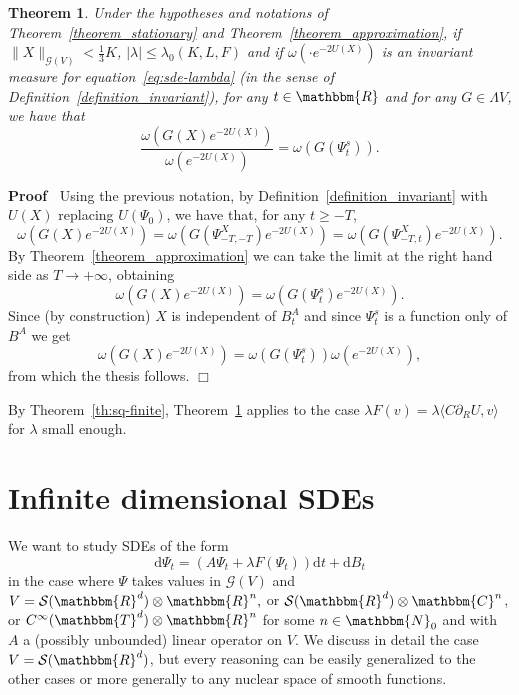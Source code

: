 \documentclass[11pt]{article}
\newcommand{\mathd}{\mathrm{d}}
\newenvironment{proof}{\noindent\textbf{Proof\ }}{\hspace*{\fill}$\Box$\medskip}
\newtheorem{theorem}{Theorem}
\begin{document}
\begin{theorem}
  \label{theorem_invariant2}Under the hypotheses and notations of
  Theorem~\ref{theorem_stationary} and Theorem~\ref{theorem_approximation}, if
  $\| X \|_{\mathcal{G} (V)} < \frac{1}{3} K$, $| \lambda | \leqslant
  \lambda_0 (K, L, F)$ and if $\omega (\cdot e^{- 2 U (X)})$ is an invariant
  measure for equation~{\eqref{eq:sde-lambda}} (in the sense of
  Definition~\ref{definition_invariant}), for any $t \in \mathbbm{R}$ and for
  any $G \in \Lambda V$, we have that
  \[ \frac{\omega (G (X) e^{- 2 U (X)})}{\omega (e^{- 2 U (X)})} = \omega (G
     (\Psi^s_t)) . \]
\end{theorem}

\begin{proof}
  Using the previous notation, by Definition~\ref{definition_invariant} with
  $U (X)$ replacing $U (\Psi_0)$, we have that, for any $t \geqslant - T$,
  \[ \omega (G (X) e^{- 2 U (X)}) = \omega (G (\Psi_{- T, - T}^X) e^{- 2 U
     (X)}) = \omega (G (\Psi_{- T, t}^X) e^{- 2 U (X)}) . \]
  By Theorem~\ref{theorem_approximation} we can take the limit at the right
  hand side as $T \rightarrow + \infty$, obtaining
  \[ \omega (G (X) e^{- 2 U (X)}) = \omega (G (\Psi^s_t) e^{- 2 U (X)}) . \]
  Since (by construction) $X$ is independent of $B^A_t$ and since $\Psi^s_t$
  is a function only of $B^A$ we get
  \[ \omega (G (X) e^{- 2 U (X)}) = \omega (G (\Psi^s_t)) \omega (e^{- 2 U
     (X)}), \]
  from which the thesis follows.
\end{proof}

\begin{remark}
  \label{remark_invariant2}By Theorem~\ref{th:sq-finite},
  Theorem~\ref{theorem_invariant2} applies to the case $\lambda F (v) =
  \lambda \langle C \partial_R U, v \rangle$ for $\lambda$ small enough.
\end{remark}

\section{Infinite dimensional SDEs}\label{sec:infinite-dim}

We want to study SDEs of the form
\begin{equation}
  \mathd \Psi_t = (A \Psi_t + \lambda F (\Psi_t)) \mathd t + \mathd B_t
  \label{eq:infinite5}
\end{equation}
in the case where $\Psi$ takes values in $\mathcal{G} (V)$ and $V =\mathcal{S}
(\mathbbm{R}^d) \otimes \mathbbm{R}^n,$ or $\mathcal{S} (\mathbbm{R}^d) \otimes
\mathbbm{C}^n$, or $C^{\infty} (\mathbbm{T}^d) \otimes \mathbbm{R}^n$ for some $n
\in \mathbbm{N}_0$ and with $A$ a (possibly unbounded) linear operator on $V$.
We discuss in detail the case $V = \mathcal{S} (\mathbbm{R}^d)$, but every
reasoning can be easily generalized to the other cases or more generally to
any nuclear space of smooth functions.
\end{document}
